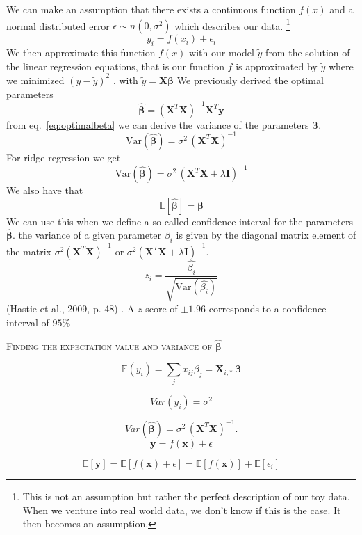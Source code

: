 \documentclass[twoside,11pt]{report}
\begin{document}
We can make an assumption that there exists a continuous function $f (x)$
and a normal distributed error $\epsilon \sim n (0, \sigma^2)$ which describes our data. \footnote{This is not an assumption but rather the perfect description of our toy data. When we venture into real world data,
    we don't know if this is the case. It then becomes an assumption.}
$$ y_i = f (x_i) + \epsilon_i$$
We then approximate this function $f(x)$ with our model $\tilde{y}$ from the solution
of the linear regression equations, that is our
function $f$ is approximated by $\tilde{y}$ where we minimized $(y - \tilde{y})^2$ , with
$\tilde{y} = \mathbf{X}\boldsymbol{\beta}$
We previously derived the optimal parameters
\begin{equation}
    \label{eq:optimalbeta}
\hat{\boldsymbol{\beta}} = \left(\mathbf{X}^T\mathbf{X}\right)^{-1}\mathbf{X}^T\mathbf{y}
\end{equation}
from eq.~\ref{eq:optimalbeta} we can derive the variance of the parameters $\boldsymbol{\beta}$.
$$
\mbox{Var}(\boldsymbol{\hat{\beta}}) = \sigma^2 \, (\mathbf{X}^{T} \mathbf{X})^{-1}
$$
For ridge regression we get
$$
\mbox{Var}(\boldsymbol{\hat{\beta}}) = \sigma^2 \, (\mathbf{X}^{T} \mathbf{X} + \lambda \mathbf{I})^{-1}
$$
We also have that
$$
\mathbb{E}[\boldsymbol{\hat{\beta}}] = \boldsymbol{\beta}
$$
We can use this when we define a so-called confidence interval
for the parameters $\boldsymbol{\hat{\beta}}$. the variance of a given parameter $\beta_i$ is given by the diagonal matrix
element of the matrix $\sigma^2(\mathbf{X}^{T} \mathbf{X})^{-1}$ or $\sigma^2(\mathbf{X}^{T} \mathbf{X} + \lambda \mathbf{I})^{-1}$.
$$
z_i = \frac{\hat{\beta_i}}{\sqrt{\mbox{Var}(\hat{\beta_i})}}
$$
(Hastie et al., 2009, p. 48) \cite{hastie01statisticallearning}. 
A $z$-score of $\pm 1.96$ corresponds to a confidence interval of $95\%$

\begin{tcolorbox}
    \centering
    \textsc{ Finding the expectation value and variance of $\boldsymbol{\hat{\beta}}$}
\end{tcolorbox}

$$
\mathbb{E}(y_i)  =\sum_{j}x_{ij} \beta_j=\mathbf{X}_{i, \ast} \, \mathbf{\beta}
$$

$$
{Var}(y_i)  = \sigma^2
$$

$$
{Var}(\mathbf{\hat{\beta}}) = \sigma^2 \, (\mathbf{X}^{T} \mathbf{X})^{-1}.
$$
$$
\mathbf{y} = f(\mathbf{x}) + \epsilon
$$

$$
\mathbb{E}[\mathbf{y}] = \mathbb{E}[f(\mathbf{x} )+ \epsilon] = \mathbb{E}[f(\mathbf{x})] + \mathbb{E}[\epsilon_i]
$$
\end{document}
